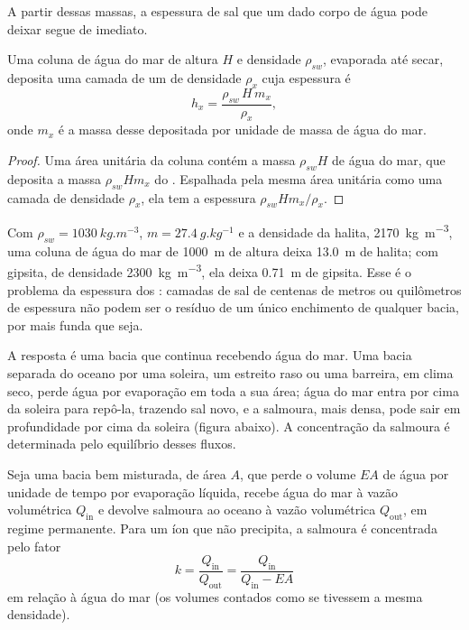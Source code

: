A partir dessas massas, a espessura de sal que um dado corpo de água pode deixar segue de
imediato.

\begin{proposition}\label{prop:b1:chemical-biogenic-sediments:column}
Uma coluna de água do mar de altura $H$ e densidade $\rho_{sw}$, evaporada até secar,
deposita uma camada de um  de densidade $\rho_x$ cuja espessura é
\[
h_x = \frac{\rho_{sw}\,H\,m_x}{\rho_x},
\]
onde $m_x$ é a massa desse  depositada por unidade de massa de água do mar.
\end{proposition}

\begin{proof}
Uma área unitária da coluna contém a massa $\rho_{sw}H$ de água do mar, que deposita a massa
$\rho_{sw}Hm_x$ do . Espalhada pela mesma área unitária como uma camada de densidade
$\rho_x$, ela tem a espessura $\rho_{sw}Hm_x/\rho_x$.
\end{proof}

Com $\rho_{sw} = \qty{1030}{kg.m^{-3}}$, $m = \qty{27.4}{g.kg^{-1}}$ e a densidade da halita,
\qty{2170}{kg.m^{-3}}, uma coluna de água do mar de \qty{1000}{m} de altura deixa
\qty{13.0}{m} de halita; com gipsita, de densidade \qty{2300}{kg.m^{-3}}, ela deixa
\qty{0.71}{m} de gipsita. Esse é o problema da espessura dos : camadas de sal de
centenas de metros ou quilômetros de espessura não podem ser o resíduo de um único
enchimento de qualquer bacia, por mais funda que seja.

A resposta é uma bacia que continua recebendo água do mar. Uma bacia separada do oceano por
uma soleira, um estreito raso ou uma barreira, em clima seco, perde água por evaporação em
toda a sua área; água do mar entra por cima da soleira para repô-la, trazendo sal novo, e
a salmoura, mais densa, pode sair em profundidade por cima da soleira (figura abaixo). A
concentração da salmoura é determinada pelo equilíbrio desses fluxos.

\begin{proposition}\label{prop:b1:chemical-biogenic-sediments:barred}
Seja uma bacia bem misturada, de área $A$, que perde o volume $EA$ de água por unidade de
tempo por evaporação líquida, recebe água do mar à vazão volumétrica $Q_{\mathrm{in}}$ e
devolve salmoura ao oceano à vazão volumétrica $Q_{\mathrm{out}}$, em regime permanente.
Para um íon que não precipita, a salmoura é concentrada pelo fator
\[
k = \frac{Q_{\mathrm{in}}}{Q_{\mathrm{out}}} = \frac{Q_{\mathrm{in}}}{Q_{\mathrm{in}} - EA}
\]
em relação à água do mar (os volumes contados como se tivessem a mesma densidade).
\end{proposition}

